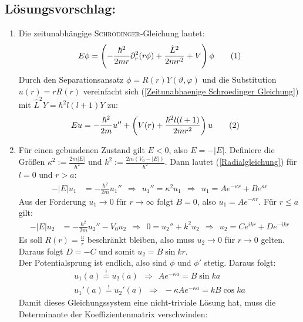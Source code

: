 \documentclass[a4paper,12pt]{article}
\newcommand\numberthis{\addtocounter{equation}{1}\tag{\theequation}}
\newcommand{\kla}{}
\begin{document}
\subsection*{Lösungsvorschlag:}
\begin{enumerate}
\item[a)] Die zeitunabhängige \textsc{Schrödinger}-Gleichung lautet:
\begin{align*}
E\phi=\kla\left( {-\frac{\hbar^2}{2mr}\partial_r^2(r\phi)+\frac{\hat{L}^2}{2mr^2}+V} \right)\phi\numberthis\label{Zeitunabhaenige Schroedinger Gleichung}
\end{align*}
Durch den Separationsansatz $\phi=R(r)Y(\vartheta,\varphi)$ und die Substitution $u(r)=rR(r)$ vereinfacht sich (\ref{Zeitunabhaenige Schroedinger Gleichung}) mit $\hat{L}^2Y=\hbar^2l(l+1)Y$ zu:
\begin{align*}
Eu&=-\frac{\hbar^2}{2m}u''+\kla\left( {V(r)+\frac{\hbar^2l(l+1)}{2mr^2}} \right)u\numberthis\label{Radialgleichung}
\end{align*}
\item[b)] Für einen gebundenen Zustand gilt $E<0$, also $E=-|E|$. Definiere die Größen $\kappa^2:=\frac{2m|E|}{\hbar^2}$ und $k^2:=\frac{2m(V_0-|E|)}{\hbar^2}$. Dann lautet (\ref{Radialgleichung}) für $l=0$ und $r>a$:
\begin{align*}
-|E|u_1&=-\frac{\hbar^2}{2m}u_1''\ \ \Rightarrow\ \ u_1''=\kappa^2u_1\ \ \Rightarrow\ \ u_1=Ae^{-\kappa r}+Be^{\kappa r}
\end{align*}
Aus der Forderung $u_1\rightarrow 0$ für $r\rightarrow\infty$ folgt $B=0$, also $u_1=Ae^{-\kappa r}$. Für $r\le a$ gilt:
\begin{align*}
-|E|u_2&=-\frac{\hbar^2}{2m}u_2''-V_0u_2\ \ \Rightarrow\ \ 0=u_2''+k^2u_2\ \ \Rightarrow\ \ u_2=Ce^{ikr}+De^{-ikr}
\end{align*}
Es soll $R(r)=\frac{u}{r}$ beschränkt bleiben, also muss $u_2\rightarrow 0$ für $r\rightarrow 0$ gelten. Daraus folgt $D=-C$ und somit $u_2=B\sin kr$.\\
Der Potentialsprung ist endlich, also sind $\phi$ und $\phi'$ stetig. Daraus folgt:
\begin{align*}
u_1(a)\overset{!}{=}u_2(a)\ \ \Rightarrow\ \ Ae^{-\kappa a}=B\sin ka\\
u_1'(a)\overset{!}{=}u_2'(a)\ \ \Rightarrow\ \ -\kappa Ae^{-\kappa a}=kB\cos ka
\end{align*}
Damit dieses Gleichungssystem eine nicht-triviale Lösung hat, muss die Determinante der Koeffizientenmatrix verschwinden:
\begin{align*}

\end{align*}
\end{enumerate}
\end{document}
